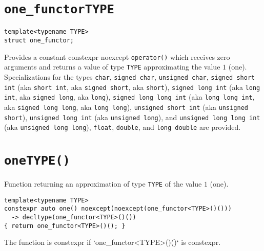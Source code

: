 \section{\texttt{one\_functor\textlangle TYPE\textrangle}}
\begin{verbatim}
template<typename TYPE>
struct one_functor;
\end{verbatim}
Provides a constant constexpr noexcept \texttt{operator()} which receives zero arguments and returns a
value of type \texttt{TYPE} approximating the value $1$ (one).
Specializations for the types
\texttt{char},
\texttt{signed char},
\texttt{unsigned char},
\texttt{signed short int}       (aka \texttt{short int},     aka \texttt{signed short},     aka \texttt{short}),
\texttt{signed long int}        (aka \texttt{long int},      aka \texttt{signed long},      aka \texttt{long}),
\texttt{signed long long int}   (aka \texttt{long long int}, aka \texttt{signed long long}, aka \texttt{long long}),
\texttt{unsigned short int}     (aka \texttt{unsigned short}),
\texttt{unsigned long int}      (aka \texttt{unsigned long}), and
\texttt{unsigned long long int} (aka \texttt{unsigned long long}),
\texttt{float},
\texttt{double}, and
\texttt{long double}
are provided.

\section{\texttt{one\textlangle TYPE\textrangle()}}
Function returning an approximation of type \texttt{TYPE} of the value $1$ (one).
\begin{verbatim}
template<typename TYPE>
constexpr auto one() noexcept(noexcept(one_functor<TYPE>()()))
  -> decltype(one_functor<TYPE>()())
{ return one_functor<TYPE>()(); }
\end{verbatim}
The function is constexpr if `one_functor<TYPE>()()` is constexpr.
